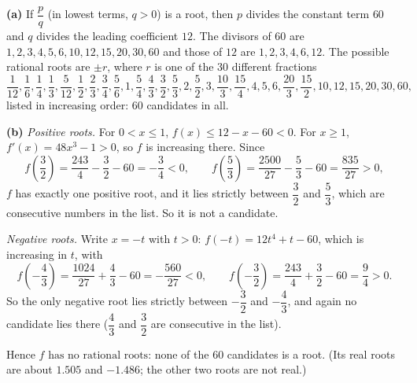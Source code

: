 \textbf{(a)} If $\dfrac pq$ (in lowest terms, $q>0$) is a root, then $p$ divides the constant term $60$ and $q$ divides the leading coefficient $12$. The divisors of $60$ are $1,2,3,4,5,6,10,12,15,20,30,60$ and those of $12$ are $1,2,3,4,6,12$. The possible rational roots are $\pm r$, where $r$ is one of the $30$ different fractions
\[\dfrac1{12},\dfrac16,\dfrac14,\dfrac13,\dfrac5{12},\dfrac12,\dfrac23,\dfrac34,\dfrac56,1,\dfrac54,\dfrac43,\dfrac32,\dfrac53,2,\dfrac52,3,\dfrac{10}3,\dfrac{15}4,4,5,6,\dfrac{20}3,\dfrac{15}2,10,12,15,20,30,60,\]
listed in increasing order: $60$ candidates in all.

\textbf{(b)} \emph{Positive roots.} For $0<x\le1$, $f(x)\le12-x-60<0$. For $x\ge1$, $f'(x)=48x^3-1>0$, so $f$ is increasing there. Since
\[f\left(\dfrac32\right)=\dfrac{243}{4}-\dfrac32-60=-\dfrac34<0,\qquad f\left(\dfrac53\right)=\dfrac{2500}{27}-\dfrac53-60=\dfrac{835}{27}>0,\]
$f$ has exactly one positive root, and it lies strictly between $\dfrac32$ and $\dfrac53$, which are consecutive numbers in the list. So it is not a candidate.

\emph{Negative roots.} Write $x=-t$ with $t>0$: $f(-t)=12t^4+t-60$, which is increasing in $t$, with
\[f\left(-\dfrac43\right)=\dfrac{1024}{27}+\dfrac43-60=-\dfrac{560}{27}<0,\qquad f\left(-\dfrac32\right)=\dfrac{243}{4}+\dfrac32-60=\dfrac94>0.\]
So the only negative root lies strictly between $-\dfrac32$ and $-\dfrac43$, and again no candidate lies there ($\dfrac43$ and $\dfrac32$ are consecutive in the list).

Hence $\boxed{f\text{ has no rational roots}}$: none of the $60$ candidates is a root. (Its real roots are about $1.505$ and $-1.486$; the other two roots are not real.)
